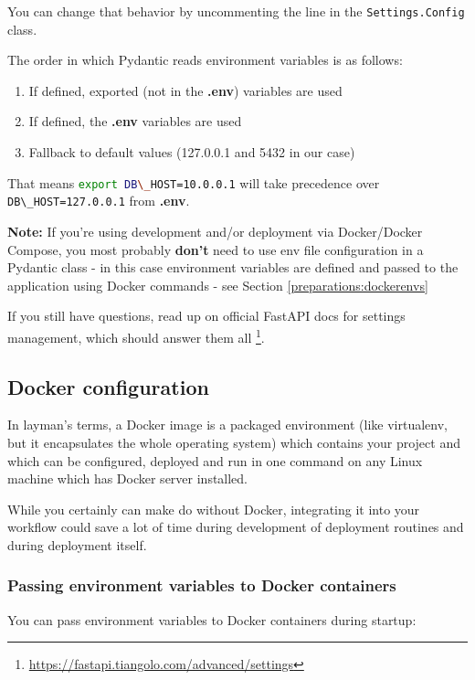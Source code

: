 \documentclass{article}
\newcommand{\flink}[1]{\footnote{\href{#1}{#1}}}
\newcommand{\note}{\textbf{\color{red}Note: }}
\newcommand{\pyinline}[1]{\lstinline[language=Python, style=cstyle, morekeywords={async}, basicstyle=\ttfamily\normalsize]{#1}}
\newcommand{\bashinline}[1]{\lstinline[language=bash, style=cstyle, morekeywords={docker, poetry, git, mv, python, uvicorn}, basicstyle=\ttfamily\normalsize]{#1}}
\begin{document}
You can change that behavior by uncommenting the line in the \pyinline{Settings.Config} class.

The order in which Pydantic reads environment variables is as follows:

\begin{enumerate}
    \item If defined, exported (not in the \textbf{.env}) variables are used
    \item If defined, the \textbf{.env} variables are used
    \item Fallback to default values (127.0.0.1 and 5432 in our case)
\end{enumerate}

That means \bashinline{export DB\_HOST=10.0.0.1} will take precedence over \bashinline{DB\_HOST=127.0.0.1} from \textbf{.env}.

\note If you're using development and/or deployment via Docker/Docker Compose, you most probably \textbf{don't} need to use env file configuration in a Pydantic class - in this case environment variables are defined and passed to the application using Docker commands - see Section \ref{preparations:dockerenvs}

If you still have questions, read up on official FastAPI docs for settings management, which should answer them all \flink{https://fastapi.tiangolo.com/advanced/settings}.

\subsection{Docker configuration}

In layman's terms, a Docker image is a packaged environment (like virtualenv, but it encapsulates the whole operating system) which contains your project and which can be configured, deployed and run in one command on any Linux machine which has Docker server installed.

While you certainly can make do without Docker, integrating it into your workflow could save a lot of time during development of deployment routines and during deployment itself.

\subsubsection{Passing environment variables to Docker containers\label{preparations:dockerenvs}}

You can pass environment variables to Docker containers during startup:
\end{document}
